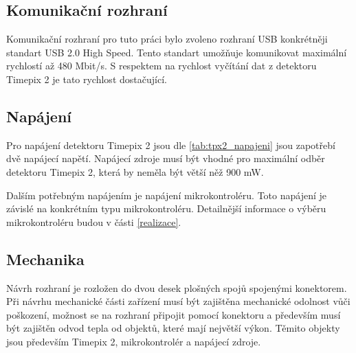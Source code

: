 \subsection{Komunikační rozhraní}
Komunikační rozhraní pro tuto práci bylo zvoleno rozhraní USB konkrétněji standart USB 2.0 High Speed. Tento standart umožňuje komunikovat maximální rychlostí až 480 Mbit/s. S respektem na rychlost vyčítání dat z detektoru Timepix 2 je tato rychlost dostačující. 

\subsection{Napájení}
Pro napájení detektoru Timepix 2 jsou dle \ref{tab:tpx2_napajeni} jsou zapotřebí dvě napájecí napětí. Napájecí zdroje musí být vhodné pro maximální odběr detektoru Timepix 2, která by neměla být větší něž 900 mW. 
\par Dalším potřebným napájením je napájení mikrokontroléru. Toto napájení je závislé na konkrétním typu mikrokontroléru. Detailnější informace o výběru mikrokontroléru budou v části \ref{realizace}.

\subsection{Mechanika}
Návrh rozhraní je rozložen do dvou desek plošných spojů spojenými konektorem. Při návrhu mechanické části zařízení musí být zajištěna mechanické odolnost vůči poškození, možnost se na rozhraní připojit pomocí konektoru a především musí být zajištěn odvod tepla od objektů, které mají největší výkon. Těmito objekty jsou především Timepix 2, mikrokontrolér a napájecí zdroje. 


